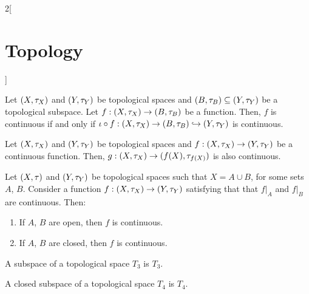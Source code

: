 \documentclass[../../../main.tex]{subfiles}
\begin{document}
\begin{multicols}{2}[\section{Topology}]
\begin{prop}
    \end{prop}
    \begin{prop}
        Let $(X,\tau_X)$ and $(Y,\tau_Y)$ be topological spaces and $(B,\tau_B)\subseteq (Y,\tau_Y)$ be a topological subspace. Let $f:(X,\tau_X)\rightarrow (B,\tau_B)$ be a function. Then, $f$ is continuous if and only if $\iota\circ f:(X,\tau_X)\rightarrow (B,\tau_B)\hookrightarrow (Y,\tau_Y)$ is continuous.
    \end{prop}
    \begin{corollary}
        Let $(X,\tau_X)$ and $(Y,\tau_Y)$ be topological spaces and $f:(X,\tau_X)\rightarrow (Y,\tau_Y)$ be a continuous function. Then, $g:(X,\tau_X)\rightarrow (f(X),\tau_{f(X)})$ is also continuous.
    \end{corollary}
    \begin{prop}
        Let $(X,\tau)$ and $(Y,\tau_Y)$ be topological spaces such that $X=A\cup B$, for some sets $A$, $B$. Consider a function $f:(X,\tau_X)\rightarrow (Y,\tau_Y)$ satisfying that that $f|_A$ and $f|_B$ are continuous. Then:
        \begin{enumerate}
            \item If $A$, $B$ are open, then $f$ is continuous.
            \item If $A$, $B$ are closed, then $f$ is continuous.
        \end{enumerate}
    \end{prop}
    \begin{theorem}
        A subspace of a topological space $T_3$ is $T_3$.
    \end{theorem}
    \begin{theorem}
        A closed subspace of a topological space $T_4$ is $T_4$.
    \end{theorem}

\end{multicols}
\end{document}
